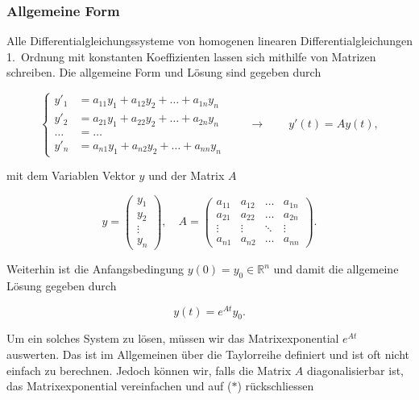 \subsubsection{Allgemeine Form}

Alle Differentialgleichungssysteme von homogenen linearen Differentialgleichungen 1.\ Ordnung mit konstanten Koeffizienten lassen sich mithilfe von Matrizen schreiben. Die allgemeine Form und Lösung sind gegeben durch

\begin{equation*}
    \left\{ \begin{aligned}
        y'_1 &= a_{11} y_1 + a_{12} y_2 + \ldots + a_{1n} y_n \\
        y'_2 &= a_{21} y_1 + a_{22} y_2 + \ldots + a_{2n} y_n \\
        \dots &= \dots \\
        y'_n &= a_{n1} y_1 + a_{n2} y_2 + \ldots + a_{nn} y_n
    \end{aligned} \right. \qquad \longrightarrow \qquad
    y'(t) = A y(t),
\end{equation*}

\vspace{0.25\baselineskip}

mit dem Variablen Vektor \( y \) und der Matrix \( A \)

\begin{equation*}
    y = \begin{pmatrix}
        y_1 \\
        y_2 \\
        \vdots \\
        y_n
    \end{pmatrix}, \quad A = \begin{pmatrix}
        a_{11} & a_{12} & \ldots & a_{1n} \\
        a_{21} & a_{22} & \ldots & a_{2n} \\
        \vdots & \vdots & \ddots & \vdots \\
        a_{n1} & a_{n2} & \ldots & a_{nn}
    \end{pmatrix}.
\end{equation*}
 
Weiterhin ist die Anfangsbedingung \( y(0) = y_0 \in \mathbb{R}^n \) und damit die allgemeine Lösung gegeben durch 

\begin{equation*}
    y(t) = e^{At} y_0.
\end{equation*}

Um ein solches System zu lösen, müssen wir das Matrixexponential \( e^{At} \) auswerten. Das ist im Allgemeinen über die Taylorreihe definiert und ist oft nicht einfach zu berechnen. Jedoch können wir, falls die Matrix \( A \) diagonalisierbar ist, das Matrixexponential vereinfachen und auf (\(*\)) rückschliessen

